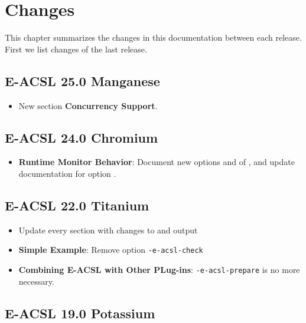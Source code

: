 \chapter{Changes}\label{chap:changes}

This chapter summarizes the changes in this documentation between each \eacsl
release. First we list changes of the last release.


\section*{E-ACSL 25.0 Manganese}

\begin{itemize}
\item New section \textbf{Concurrency Support}.
\end{itemize}

\section*{E-ACSL 24.0 Chromium}

\begin{itemize}
\item \textbf{Runtime Monitor Behavior}: Document new options
   and  of
  \eacslgcc, and update documentation for option .
\end{itemize}

\section*{E-ACSL 22.0 Titanium}

\begin{itemize}
\item Update every section with changes to \framac and \eacslgcc output
\item \textbf{Simple Example}: Remove option \texttt{-e-acsl-check}
\item \textbf{Combining E-ACSL with Other PLug-ins}: \texttt{-e-acsl-prepare} is
  no more necessary.
\end{itemize}

\section*{E-ACSL 19.0 Potassium}

